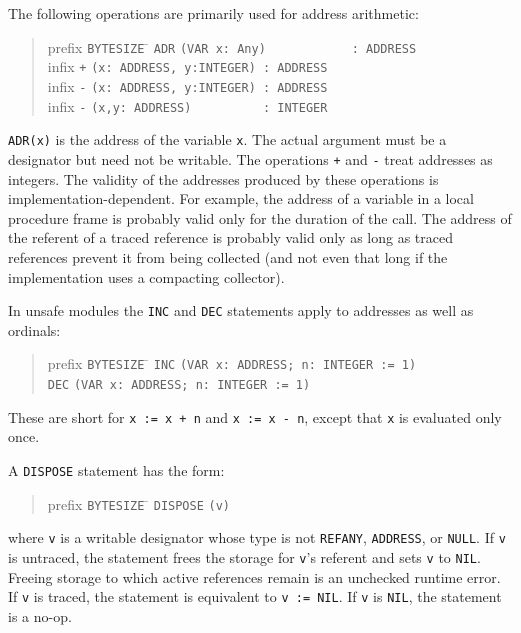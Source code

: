 \documentclass[10pt]{article}
\begin{document}
The following operations are primarily used for address arithmetic:
\begin{quote}
  \begin{tabbing}
    prefix \= \verb|BYTESIZE| \= \kill
           \> \verb|ADR| \> \verb|(VAR x: Any)            : ADDRESS| \\
    infix  \> \verb|+|   \> \verb|(x: ADDRESS, y:INTEGER) : ADDRESS| \\
    infix  \> \verb|-|   \> \verb|(x: ADDRESS, y:INTEGER) : ADDRESS| \\
    infix  \> \verb|-|   \> \verb|(x,y: ADDRESS)          : INTEGER|
  \end{tabbing}
\end{quote}
\verb|ADR(x)| is the address of the variable \verb|x|.  The actual argument
must be a designator but need not be writable.  The operations \verb|+| and
\verb|-| treat addresses as integers.  The validity of the addresses produced
by these operations is implementation-dependent.  For example, the address of
a variable in a local procedure frame is probably valid only for the duration
of the call.  The address of the referent of a traced reference is probably
valid only as long as traced references prevent it from being collected (and
not even that long if the implementation uses a compacting collector).

In unsafe modules the \verb|INC| and \verb|DEC| statements apply to addresses
as well as ordinals:
\begin{quote}
  \begin{tabbing}
    prefix \= \verb|BYTESIZE| \= \kill
    \> \verb|INC| \> \verb|(VAR x: ADDRESS; n: INTEGER := 1)| \\
    \> \verb|DEC| \> \verb|(VAR x: ADDRESS; n: INTEGER := 1)|
  \end{tabbing}
\end{quote}
These are short for \verb|x := x + n| and \verb|x := x - n|, except that
\verb|x| is evaluated only once.

A \verb|DISPOSE| statement has the form:
\begin{quote}
  \begin{tabbing}
    prefix \= \verb|BYTESIZE| \= \kill
           \> \verb|DISPOSE|  \> \verb|(v)|
  \end{tabbing}
\end{quote}
where \verb|v| is a writable designator whose type is not \verb|REFANY|,
\verb|ADDRESS|, or \verb|NULL|.  If \verb|v| is untraced, the statement frees
the storage for \verb|v|'s referent and sets \verb|v| to \verb|NIL|.  Freeing
storage to which active references remain is an unchecked runtime error.  If
\verb|v| is traced, the statement is equivalent to \verb|v := NIL|.  If
\verb|v| is \verb|NIL|, the statement is a no-op.
\end{document}
